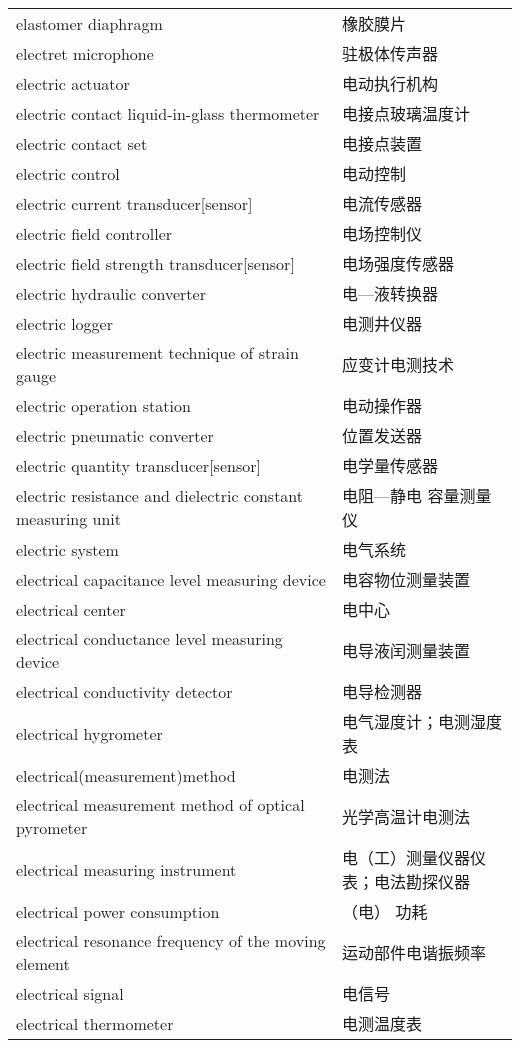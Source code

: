 \documentclass[
]{article}
\begin{document}
\begin{longtable}[]{@{}ll@{}}
elastomer diaphragm & 橡胶膜片 \\
electret microphone & 驻极体传声器 \\
electric actuator & 电动执行机构 \\
electric contact liquid-in-glass thermometer & 电接点玻璃温度计 \\
electric contact set & 电接点装置 \\
electric control & 电动控制 \\
electric current transducer{[}sensor{]} & 电流传感器 \\
electric field controller & 电场控制仪 \\
electric field strength transducer{[}sensor{]} & 电场强度传感器 \\
electric hydraulic converter & 电---液转换器 \\
electric logger & 电测井仪器 \\
electric measurement technique of strain gauge & 应变计电测技术 \\
electric operation station & 电动操作器 \\
electric pneumatic converter & 位置发送器 \\
electric quantity transducer{[}sensor{]} & 电学量传感器 \\
electric resistance and dielectric constant measuring unit & 电阻---静电
容量测量仪 \\
electric system & 电气系统 \\
electrical capacitance level measuring device & 电容物位测量装置 \\
electrical center & 电中心 \\
electrical conductance level measuring device & 电导液闰测量装置 \\
electrical conductivity detector & 电导检测器 \\
electrical hygrometer & 电气湿度计；电测湿度表 \\
electrical(measurement)method & 电测法 \\
electrical measurement method of optical pyrometer & 光学高温计电测法 \\
electrical measuring instrument & 电（工）测量仪器仪表；电法勘探仪器 \\
electrical power consumption & （电） 功耗 \\
electrical resonance frequency of the moving element &
运动部件电谐振频率 \\
electrical signal & 电信号 \\
electrical thermometer & 电测温度表 \\

\end{longtable}
\end{document}
